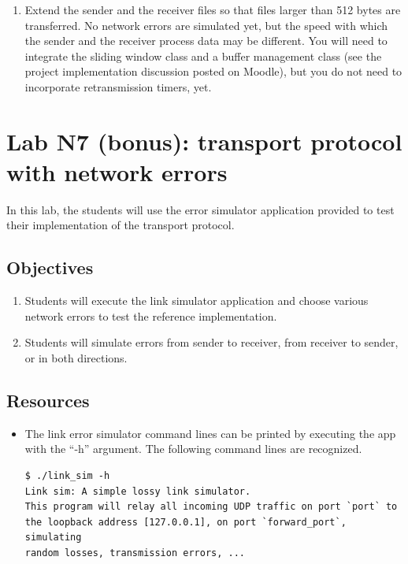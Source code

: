 \documentclass[12pt]{book}
\begin{document}
\begin{enumerate}[label=\arabic*.]
\begin{enumerate}[label=\arabic*.]
  \item \label{pl6.trei} Extend the sender and the receiver files so that files larger than 512 bytes are transferred. No network errors are simulated yet, but the speed with which the sender and the receiver process data may be different. You will need to integrate the sliding window class and a buffer management class (see the project implementation discussion posted on Moodle), but you do not need to incorporate retransmission timers, yet. 
\end{enumerate}



\chapter{Lab N7 (bonus): transport protocol with network errors}

In this lab, the students will use the error simulator application provided to test their implementation of the transport protocol. 

\section{Objectives}

\begin{enumerate}[label=Objective \arabic*]
\item\label{pl7.unu} Students will execute the link simulator application and choose various network errors to test the reference implementation.
  \item\label{pl7.doi} Students will simulate errors from sender to receiver, from receiver to sender, or in both directions.
\end{enumerate}


\section{Resources}\label{pl7.res}
  
\begin{itemize}[label=--]
\item The link error simulator command lines can be printed by executing the app with the ``-h'' argument. The following command lines are recognized.
\begin{verbatim}
$ ./link_sim -h
Link sim: A simple lossy link simulator.
This program will relay all incoming UDP traffic on port `port` to
the loopback address [127.0.0.1], on port `forward_port`, simulating 
random losses, transmission errors, ...


\end{verbatim}
\end{itemize}
\end{enumerate}
\end{document}
